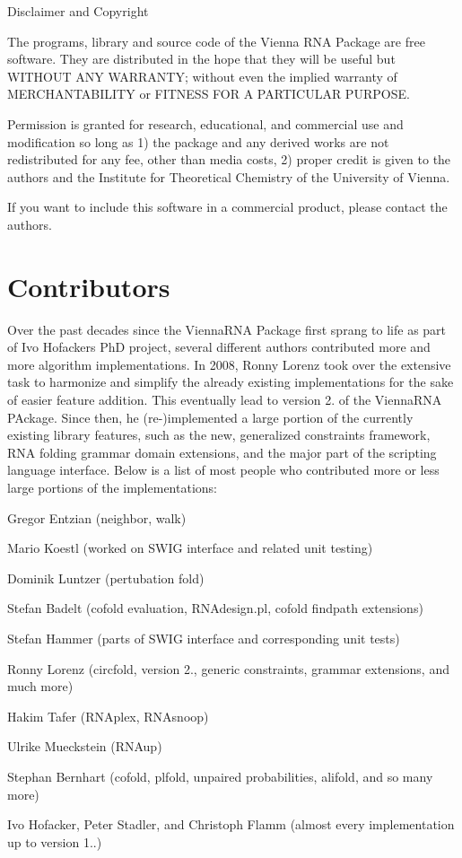 \begin{DoxyVerbInclude}
			 Disclaimer and Copyright

The programs, library and source code of the Vienna RNA Package are free
software. They are distributed in the hope that they will be useful
but WITHOUT ANY WARRANTY; without even the implied warranty of
MERCHANTABILITY or FITNESS FOR A PARTICULAR PURPOSE.  

Permission is granted for research, educational, and commercial use
and modification so long as 1) the package and any derived works are not
redistributed for any fee, other than media costs, 2) proper credit is
given to the authors and the Institute for Theoretical Chemistry of the 
University of Vienna.

If you want to include this software in a commercial product, please contact 
the authors. 

\end{DoxyVerbInclude}
\hypertarget{index_contributors}{}\section{Contributors}\label{index_contributors}
Over the past decades since the {\ttfamily Vienna\+R\+NA Package} first sprang to life as part of Ivo Hofackers PhD project, several different authors contributed more and more algorithm implementations. In 2008, Ronny Lorenz took over the extensive task to harmonize and simplify the already existing implementations for the sake of easier feature addition. This eventually lead to version 2. of the {\ttfamily Vienna\+R\+NA P\+Ackage}. Since then, he (re-\/)implemented a large portion of the currently existing library features, such as the new, generalized constraints framework, R\+NA folding grammar domain extensions, and the major part of the scripting language interface. Below is a list of most people who contributed more or less large portions of the implementations\+:


\begin{DoxyItemize}
\item Gregor Entzian (neighbor, walk)
\item Mario Koestl (worked on S\+W\+IG interface and related unit testing)
\item Dominik Luntzer (pertubation fold)
\item Stefan Badelt (cofold evaluation, R\+N\+Adesign.\+pl, cofold findpath extensions)
\item Stefan Hammer (parts of S\+W\+IG interface and corresponding unit tests)
\item Ronny Lorenz (circfold, version 2., generic constraints, grammar extensions, and much more)
\item Hakim Tafer (R\+N\+Aplex, R\+N\+Asnoop)
\item Ulrike Mueckstein (R\+N\+Aup)
\item Stephan Bernhart (cofold, plfold, unpaired probabilities, alifold, and so many more)
\item Ivo Hofacker, Peter Stadler, and Christoph Flamm (almost every implementation up to version 1..)
\end{DoxyItemize}

